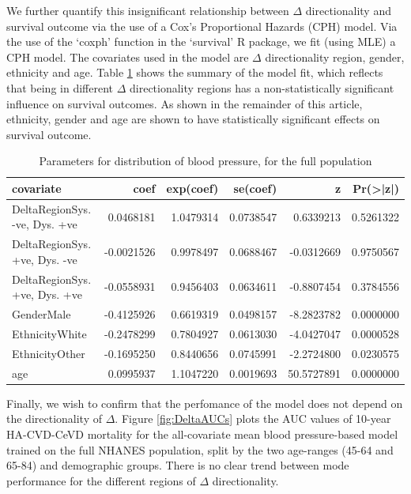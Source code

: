 \documentclass[
]{article}
\begin{document}
We further quantify this insignificant relationship between \(\Delta\) directionality and survival outcome via the use of a Cox's Proportional Hazards (CPH) model. Via the use of the `coxph' function in the `survival' R package, we fit (using MLE) a CPH model. The covariates used in the model are \(\Delta\) directionality region, gender, ethnicity and age. Table \ref{tab:DeltaDir} shows the summary of the model fit, which reflects that being in different \(\Delta\) directionality regions has a non-statistically significant influence on survival outcomes. As shown in the remainder of this article, ethnicity, gender and age are shown to have statistically significant effects on survival outcome.

\begin{table}

\caption{\label{tab:DeltaDir}Parameters for distribution of blood pressure, for the full population}
\centering
\begin{tabular}[t]{lrrrrr}
\toprule
covariate & coef & exp(coef) & se(coef) & z & Pr(>|z|)\\
\midrule
DeltaRegionSys. -ve, Dys. +ve & 0.0468181 & 1.0479314 & 0.0738547 & 0.6339213 & 0.5261322\\
DeltaRegionSys. +ve, Dys. -ve & -0.0021526 & 0.9978497 & 0.0688467 & -0.0312669 & 0.9750567\\
DeltaRegionSys. +ve, Dys. +ve & -0.0558931 & 0.9456403 & 0.0634611 & -0.8807454 & 0.3784556\\
GenderMale & -0.4125926 & 0.6619319 & 0.0498157 & -8.2823782 & 0.0000000\\
EthnicityWhite & -0.2478299 & 0.7804927 & 0.0613030 & -4.0427047 & 0.0000528\\
\addlinespace
EthnicityOther & -0.1695250 & 0.8440656 & 0.0745991 & -2.2724800 & 0.0230575\\
age & 0.0995937 & 1.1047220 & 0.0019693 & 50.5727891 & 0.0000000\\
\bottomrule
\end{tabular}
\end{table}

Finally, we wish to confirm that the perfomance of the model does not depend on the directionality of \(\Delta\). Figure \ref{fig:DeltaAUCs} plots the AUC values of 10-year HA-CVD-CeVD mortality for the all-covariate mean blood pressure-based model trained on the full NHANES population, split by the two age-ranges (45-64 and 65-84) and demographic groups. There is no clear trend between mode performance for the different regions of \(\Delta\) directionality.
\end{document}
